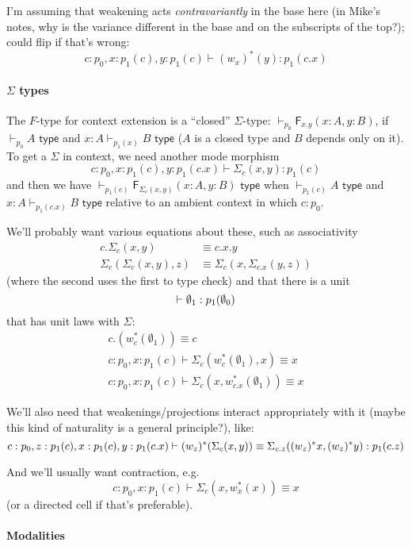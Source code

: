 \documentclass[10pt]{article}
\newcommand{\yields}{\vdash}
\newcommand{\type}{\,\,\mathsf{type}}
\newcommand\F[2]{\ensuremath{\mathsf{F}_{#1}(#2)}}
\begin{document}
I'm assuming that weakening acts \emph{contravariantly} in the base here
(in Mike's notes, why is the variance different in the base and on the
subscripts of the top?); could flip if that's wrong:
\[
c : p_0, x : p_1(c), y : p_1(c) \vdash (w_x)^*(y) : p_1(c.x)
\]

\paragraph{$\Sigma$ types}
The $F$-type for context extension is a ``closed'' $\Sigma$-type:
$\yields_{p_0} \F{x.y}{x : A, y : B}$, if $\yields_{p_0} A \type$ and $x
: A \vdash_{p_1(x)} B \type$ ($A$ is a closed type and $B$ depends only
on it).  To get a $\Sigma$ in context, we need another mode morphism
\[
c : p_0, x : p_1(c), y : p_1(c.x) \yields \Sigma_c(x,y) : p_1(c) 
\]
and then we have $\vdash_{p_1(c)} \F{\Sigma_c(x,y)}{x : A, y : B} \type$
when $\yields_{p_1(c)} A \type$ and $x : A \vdash_{p_1(c.x)} B \type$
relative to an ambient context in which $c : p_0$.

We'll probably want various equations about these, such as 
associativity
\begin{align*}
c.\Sigma_c(x,y) &\equiv c.x.y \\
\Sigma_c(\Sigma_c(x,y),z) & \equiv \Sigma_c(x,\Sigma_{c.x}(y,z))
\end{align*}
(where the second uses the first to type check)
and that there is a unit 
\[
\yields \emptyset_1 : p_1(\emptyset_0) \\
\]
that has unit laws with $\Sigma$:
\begin{align*}
c.(w_c^*(\emptyset_1)) \equiv c\\
c : p_0, x : p_1(c) \yields \Sigma_c(w_c^*(\emptyset_1),x) \equiv x\\
c : p_0, x : p_1(c) \yields \Sigma_c(x,w_{c.x}^*(\emptyset_1)) \equiv x
\end{align*}

We'll also need that weakenings/projections interact appropriately with
it (maybe this kind of naturality is a general principle?), like:
\[
c : p_0, z : p_1(c), x : p_1(c), y : p_1(c.x) \yields
(w_z)^*(\Sigma_c(x,y)) \equiv 
\Sigma_{c.z}((w_z)^* x,(w_z)^* y)
 : p_1(c.z) \\
\]

And we'll usually want contraction, e.g.
\[
c : p_0, x : p_1(c) \yields \Sigma_{c}(x,w_x^*(x)) \equiv x
\]
(or a directed cell if that's preferable).  

\paragraph{Modalities}
\end{document}
